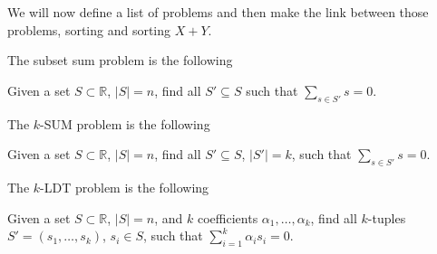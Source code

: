 We will now define a list of problems and then make the link between those
problems, sorting and sorting $X + Y$.

The subset sum problem is the following

\begin{problem}
Given a set $S \subset \mathbb{R}$, $\left\vert{S}\right\vert = n$, find all
$S' \subseteq S$ such that $\sum\limits_{s \in S'} s = 0$.
\end{problem}


The $k$-SUM problem is the following

\begin{problem}
Given a set $S \subset \mathbb{R}$, $\left\vert{S}\right\vert = n$, find all
$S' \subseteq S$, $\left\vert{S'}\right\vert = k$, such that $\sum\limits_{s \in S'} s = 0$.
\end{problem}


The $k$-LDT problem is the following

\begin{problem}
Given a set $S \subset \mathbb{R}$, $\left\vert{S}\right\vert = n$, and $k$
coefficients $\alpha_1, \dots, \alpha_k$, find all $k$-tuples
$S' = (s_1, \dots, s_k)$, $s_i \in S$, such that
$\sum_{i=1}^{k} \alpha_i s_i = 0$.
\end{problem}

